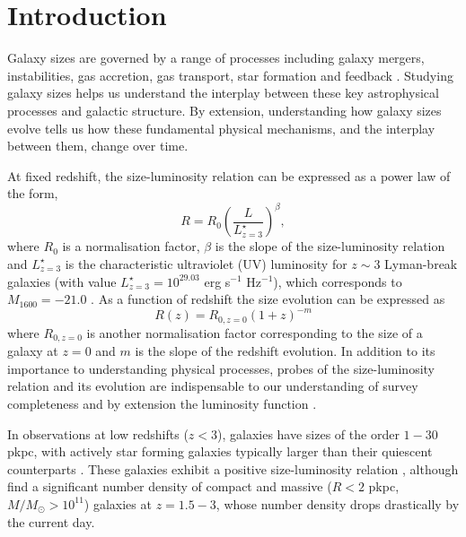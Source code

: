 \section{Introduction}

Galaxy sizes are governed by a range of processes including galaxy mergers, instabilities, gas accretion, gas transport, star formation and feedback \citep{Conselice14}. Studying galaxy sizes helps us understand the interplay between these key astrophysical processes and galactic structure. By extension, understanding how galaxy sizes evolve tells us how these fundamental physical mechanisms, and the interplay between them, change over time. %

At fixed redshift, the size-luminosity relation can be expressed as a power law of the form,
\begin{equation}
    R = R_0 \left(\frac{L}{L_{z=3}^{\star}}\right)^\beta,
\label{eq:size_lumin_fit}
\end{equation}
where $R_0$ is a normalisation factor, $\beta$ is the slope of the size-luminosity relation and $L_{z=3}^{\star}$ is the characteristic ultraviolet (UV) luminosity for $z\sim3$ Lyman-break galaxies (with value $L_{z=3}^{\star}=10^{29.03}$ erg s$^{-1}$ Hz$^{-1}$), which corresponds to $M_{1600} = -21.0$ \citep{Steidel_1999}. As a function of redshift the size evolution can be expressed as
\begin{equation}
    R(z)=R_{0,z=0}(1+z)^{-m}
\label{eq:evo}
\end{equation}
where $R_{0,z=0}$ is another normalisation factor corresponding to the size of a galaxy at $z=0$ and $m$ is the slope of the redshift evolution. In addition to its importance to understanding physical processes, probes of the size-luminosity relation and its evolution are indispensable to our understanding of survey completeness and by extension the luminosity function \citep{Kawamata_2018, Bouwens2021}.

In observations at low redshifts ($z<3$), galaxies have sizes of the order $1-30$ pkpc, with actively star forming galaxies typically larger than their quiescent counterparts \citep{Zhang_2019,Kawinwanichakij_2021}. These galaxies exhibit a positive size-luminosity relation \citep{van_der_Wel_2014,Suess_2019,Kawinwanichakij_2021}, although \cite{van_der_Wel_2014} find a significant number density of compact and massive ($R<2$ pkpc, $M/M_\odot>10^{11}$) galaxies at $z=1.5-3$, whose number density drops drastically by the current day. 

